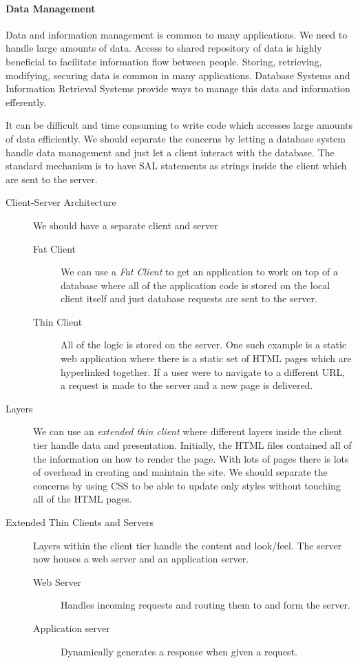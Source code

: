 \paragraph{Data Management}\label{par:data_management}

Data and information management is common to many applications. We need to handle large amounts of data.
Access to shared repository of data is highly beneficial to facilitate information flow between people.
Storing, retrieving, modifying, securing data is common in many applications.
Database Systems and Information Retrieval Systems provide ways to manage this data and information efferently.

It can be difficult and time consuming to write code which accesses large amounts of data efficiently.
We should separate the concerns by letting a database system handle data management and just let a client interact with the database.
The standard mechanism is to have SAL statements as strings inside the client which are sent to the server.

\begin{description}
	\item[Client-Server Architecture] We should have a separate client and server
	      \begin{description}
		      \item[Fat Client] We can use a \emph{Fat Client} to get an application to work on top of a database where all of the application code is stored on the local client itself and just database requests are sent to the server.
		      \item[Thin Client] All of the logic is stored on the server.
		            One such example is a static web application where there is a static set of HTML pages which are hyperlinked together.
		            If a user were to navigate to a different URL, a request is made to the server and a new page is delivered.
	      \end{description}
	\item[Layers] We can use an \emph{extended thin client} where different layers inside the client tier handle data and presentation.
	      Initially, the HTML files contained all of the information on how to render the page.
	      With lots of pages there is lots of overhead in creating and maintain the site.
	      We should separate the concerns by using CSS to be able to update only styles without touching all of the HTML pages.
	\item[Extended Thin Clients and Servers] Layers within the client tier handle the content and look/feel.
	      The server now houses a web server and an application server.
	      \begin{description}
		      \item[Web Server] Handles incoming requests and routing them to and form the server.
		      \item[Application server] Dynamically generates a response when given a request.
	      \end{description}
\end{description}

